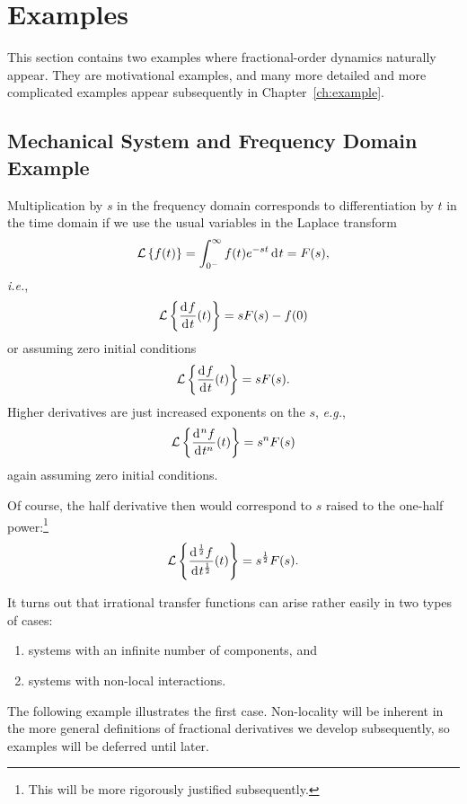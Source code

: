 \section{Examples}

This section contains two examples where fractional-order dynamics naturally appear. They are motivational examples, and many more detailed and more complicated examples appear subsequently in Chapter~\ref{ch:example}. 
\subsection{Mechanical System and Frequency Domain Example}
\label{sec:introexamples}

Multiplication by $s$ in the frequency domain corresponds to differentiation by $t$ in the time domain if we use the
usual variables in the Laplace transform
\begin{equation}
  \mathcal{L} \left\{ f(t) \right\} = \int_{0^-}^\infty f(t) e^{-s t} \operatorname{d}\hspace*{-1pt} t = F(s),
\end{equation}
\textit{i.e.}, 
\begin{equation}
  \mathcal L \left\{ \frac{\operatorname{d}\hspace*{-1pt} f}{\operatorname{d}\hspace*{-1pt} t}(t) \right\} = s F(s) - f(0)
\end{equation}
or assuming zero initial conditions
\begin{equation}
  \mathcal L \left\{ \frac{\operatorname{d}\hspace*{-1pt} f}{\operatorname{d}\hspace*{-1pt} t}(t) \right\} = s F(s).
\end{equation}
Higher derivatives are just increased exponents on the $s$, \textit{e.g.}, 
\begin{equation}
  \mathcal L \left\{ \frac{\operatorname{d}\hspace*{-1pt}^n f}{\operatorname{d}\hspace*{-1pt} t^n}(t) \right\} = s^n F(s)
\end{equation}
again assuming zero initial conditions.

Of course, the half derivative then would correspond to $s$ raised to the one-half power:\footnote{This will be more rigorously justified subsequently.}
\begin{equation}
  \mathcal L \left\{ \frac{\operatorname{d}\hspace*{-1pt}^\frac{1}{2} f}{\operatorname{d}\hspace*{-1pt} t^\frac{1}{2}}(t) \right\} = s^\frac{1}{2} F(s).
\end{equation}

It turns out that irrational transfer functions can arise rather easily in two types of cases:
\begin{enumerate}
  \item systems with an infinite number of components, and
  \item systems with non-local interactions.
\end{enumerate}
The following example illustrates the first case. Non-locality will be inherent in the more general definitions of fractional derivatives we develop subsequently, so examples will be deferred until later.

